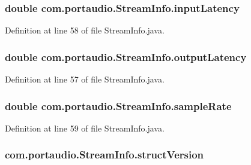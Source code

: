 \subsubsection[{\texorpdfstring{input\+Latency}{inputLatency}}]{\setlength{\rightskip}{0pt plus 5cm}double com.\+portaudio.\+Stream\+Info.\+input\+Latency}\hypertarget{classcom_1_1portaudio_1_1_stream_info_a99ed89ce6b1cd76ef843a40ce9bd043f}{}\label{classcom_1_1portaudio_1_1_stream_info_a99ed89ce6b1cd76ef843a40ce9bd043f}


Definition at line 58 of file Stream\+Info.\+java.

\subsubsection[{\texorpdfstring{output\+Latency}{outputLatency}}]{\setlength{\rightskip}{0pt plus 5cm}double com.\+portaudio.\+Stream\+Info.\+output\+Latency}\hypertarget{classcom_1_1portaudio_1_1_stream_info_a37a3420ed8708f6a534491ab47552c92}{}\label{classcom_1_1portaudio_1_1_stream_info_a37a3420ed8708f6a534491ab47552c92}


Definition at line 57 of file Stream\+Info.\+java.

\subsubsection[{\texorpdfstring{sample\+Rate}{sampleRate}}]{\setlength{\rightskip}{0pt plus 5cm}double com.\+portaudio.\+Stream\+Info.\+sample\+Rate}\hypertarget{classcom_1_1portaudio_1_1_stream_info_a30b6369d8eeb6a6e5195c4858d4d4281}{}\label{classcom_1_1portaudio_1_1_stream_info_a30b6369d8eeb6a6e5195c4858d4d4281}


Definition at line 59 of file Stream\+Info.\+java.

\subsubsection[{\texorpdfstring{struct\+Version}{structVersion}}]{ com.\+portaudio.\+Stream\+Info.\+struct\+Version}\hypertarget{classcom_1_1portaudio_1_1_stream_info_a6da7fdf20fa3ea210576ca28ead9e1ca}{}\label{classcom_1_1portaudio_1_1_stream_info_a6da7fdf20fa3ea210576ca28ead9e1ca}



